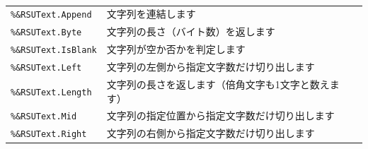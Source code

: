 \paragraph{\DocStrTitleRDMPackageFunctionList}
\begin{center}
{\footnotesize
\begin{xltabular}{\textwidth}{|p{4truecm}|X|p{1.2truecm}|}
\hline
\thead{\DocStrHeaderFunctionName}&\thead{\DocStrDescription}&\thead{\DocStrRefto}\\
\hline
\hline
\texttt{\%\&RSUText.Append}&文字列を連結します&\\
\hline
\texttt{\%\&RSUText.Byte}&文字列の長さ（バイト数）を返します&\\
\hline
\texttt{\%\&RSUText.IsBlank}&文字列が空か否かを判定します&\\
\hline
\texttt{\%\&RSUText.Left}&文字列の左側から指定文字数だけ切り出します&\\
\hline
\texttt{\%\&RSUText.Length}&文字列の長さを返します（倍角文字も1文字と数えます）&\\
\hline
\texttt{\%\&RSUText.Mid}&文字列の指定位置から指定文字数だけ切り出します&\\
\hline
\texttt{\%\&RSUText.Right}&文字列の右側から指定文字数だけ切り出します&\\
\hline
\end{xltabular}
}
\end{center}
